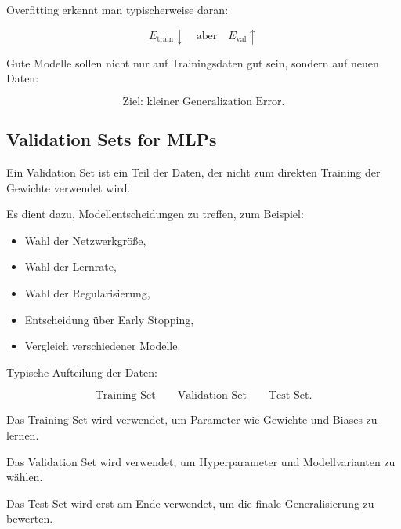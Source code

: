 \documentclass[11pt,a4paper]{scrartcl}
\begin{document}
\begin{answerbox}
    Overfitting erkennt man typischerweise daran:

    \[
        \boxed{
            E_{\mathrm{train}} \downarrow
            \quad \text{aber} \quad
            E_{\mathrm{val}} \uparrow
        }
    \]

    Gute Modelle sollen nicht nur auf Trainingsdaten gut sein, sondern auf neuen
    Daten:

    \[
        \boxed{
            \text{Ziel: kleiner Generalization Error.}
        }
    \]
\end{answerbox}

\subsection{Validation Sets for MLPs}

\begin{notebox}
    Ein Validation Set ist ein Teil der Daten, der nicht zum direkten Training
    der Gewichte verwendet wird.

    Es dient dazu, Modellentscheidungen zu treffen, zum Beispiel:

    \begin{itemize}
        \item Wahl der Netzwerkgröße,
        \item Wahl der Lernrate,
        \item Wahl der Regularisierung,
        \item Entscheidung über Early Stopping,
        \item Vergleich verschiedener Modelle.
    \end{itemize}
\end{notebox}

\begin{solutionbox}
    Typische Aufteilung der Daten:

    \[
        \text{Training Set}
        \qquad
        \text{Validation Set}
        \qquad
        \text{Test Set}.
    \]

    Das Training Set wird verwendet, um Parameter wie Gewichte und Biases zu
    lernen.

    Das Validation Set wird verwendet, um Hyperparameter und Modellvarianten zu
    wählen.

    Das Test Set wird erst am Ende verwendet, um die finale Generalisierung zu
    bewerten.
\end{solutionbox}
\end{document}

